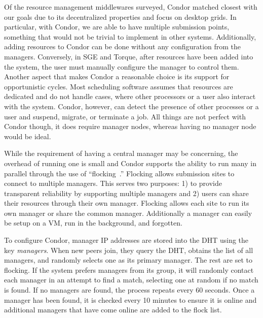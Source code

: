 \documentclass[conference]{IEEEtran}
\begin{document}
\addtocounter{footnote}{1}
\addtocounter{footnote}{1}
\addtocounter{footnote}{1}

Of the resource management middlewares surveyed, Condor matched closest with
our goals due to its decentralized properties and focus on desktop grids.  In
particular, with Condor, we are able to have multiple submission points,
something that would not be trivial to implement in other systems.
Additionally, adding resources to Condor can be done without any configuration
from the managers.  Conversely, in SGE and Torque, after resources have been
added into the system, the user must manually configure the manager to control
them.  Another aspect that makes Condor a reasonable choice is its support for
opportunistic cycles.  Most scheduling software assumes that resources are
dedicated and do not handle cases, where other processors or a user also
interact with the system.  Condor, however, can detect the presence of other
processes or a user and suspend, migrate, or terminate a job.  All things are
not perfect with Condor though, it does require manager nodes, whereas having
no manager node would be ideal.

While the requirement of having a central manager may be concerning, the
overhead of running one is small and Condor supports the ability to run many in
parallel through the use of ``flocking~\cite{flocking}.'' Flocking allows
submission sites to connect to multiple managers.  This serves two purposes: 1)
to provide transparent reliability by supporting multiple managers and 2) users
can share their resources through their own manager.  Flocking allows each site
to run its own manager or share the common manager.  Additionally a manager can
easily be setup on a VM, run in the background, and forgotten.

To configure Condor, manager IP addresses are stored into the DHT using the key
\emph{managers}.  When new peers join, they query the DHT, obtains the list of
all managers, and randomly selects one as its primary manager.  The rest are
set to flocking.  If the system prefers managers from its group, it will
randomly contact each manager in an attempt to find a match, selecting one at
random if no match is found.  If no managers are found, the process repeats
every 60 seconds.  Once a manager has been found, it is checked every 10
minutes to ensure it is online and additional managers that have come online
are added to the flock list.
\end{document}
